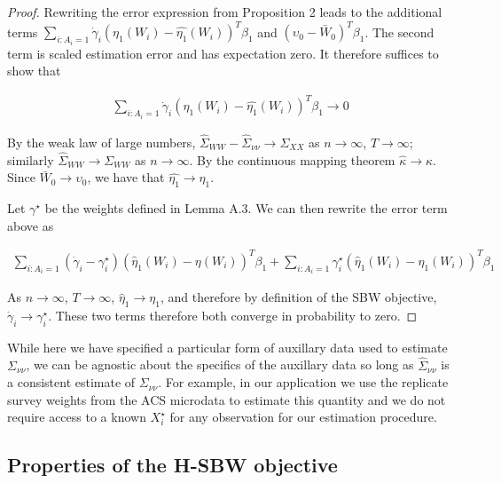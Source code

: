 \begin{proof}
Rewriting the error expression from Proposition 2 leads to the additional terms $\sum_{i: A_i = 1}\dot{\gamma}_i(\eta_1(W_i) - \hat{\eta_1}(W_i))^T\beta_1$ and $(\upsilon_0 - \bar{W}_0)^T\beta_1$. The second term is scaled estimation error and has expectation zero. It therefore suffices to show that 

\begin{align*}
\sum_{i: A_i = 1}\dot{\gamma}_i(\eta_1(W_i) - \hat{\eta_1}(W_i))^T\beta_1 \to 0
\end{align*}

By the weak law of large numbers, $\hat{\Sigma}_{WW} - \hat{\Sigma}_{\nu\nu} \to \Sigma_{XX}$ as $n \to \infty$, $T \to \infty$; similarly $\hat{\Sigma}_{WW} \to \Sigma_{WW}$ as $n \to \infty$. By the continuous mapping theorem $\hat{\kappa} \to \kappa$. Since $\bar{W}_0 \to \upsilon_0$, we have that $\hat{\eta_1} \to \eta_1$. 

Let $\gamma^\star$ be the weights defined in Lemma A.3. We can then rewrite the error term above as

\begin{align*}
\sum_{i: A_i = 1}(\dot{\gamma}_i - \gamma_i^\star)(\hat{\eta}_1(W_i) - \eta(W_i))^T\beta_1 + \sum_{i: A_i = 1}\gamma_i^\star(\hat{\eta}_1(W_i) - \eta_1(W_i))^T\beta_1
\end{align*}

As $n \to \infty$, $T \to \infty$, $\hat{\eta}_1 \to \eta_1$, and therefore by definition of the SBW objective, $\dot{\gamma}_i \to \gamma_i^\star$. These two terms therefore both converge in probability to zero. 
\end{proof}

\begin{remark}
While here we have specified a particular form of auxillary data used to estimate $\Sigma_{\nu\nu}$, we can be agnostic about the specifics of the auxillary data so long as $\hat{\Sigma}_{\nu\nu}$ is a consistent estimate of $\Sigma_{\nu\nu}$. For example, in our application we use the replicate survey weights from the ACS microdata to estimate this quantity and we do not require access to a known $X_i^\star$ for any observation for our estimation procedure.
\end{remark}

\subsection{Properties of the H-SBW objective}\label{app:AsecII}

